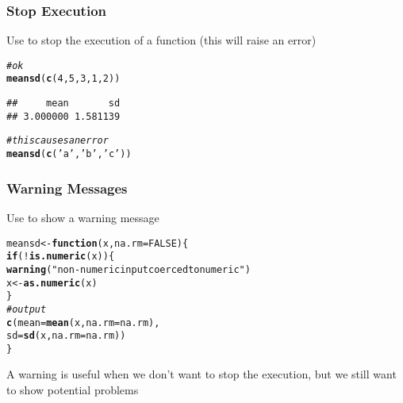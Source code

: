 \documentclass[12pt]{beamer}\usepackage[]{graphicx}\usepackage[]{color}
\makeatletter
\newcommand{\hlnum}[1]{\textcolor[rgb]{0.686,0.059,0.569}{#1}}%
\newcommand{\hlstr}[1]{\textcolor[rgb]{0.192,0.494,0.8}{#1}}%
\newcommand{\hlcom}[1]{\textcolor[rgb]{0.678,0.584,0.686}{\textit{#1}}}%
\newcommand{\hlopt}[1]{\textcolor[rgb]{0,0,0}{#1}}%
\newcommand{\hlstd}[1]{\textcolor[rgb]{0.345,0.345,0.345}{#1}}%
\newcommand{\hlkwa}[1]{\textcolor[rgb]{0.161,0.373,0.58}{\textbf{#1}}}%
\newcommand{\hlkwb}[1]{\textcolor[rgb]{0.69,0.353,0.396}{#1}}%
\newcommand{\hlkwc}[1]{\textcolor[rgb]{0.333,0.667,0.333}{#1}}%
\newcommand{\hlkwd}[1]{\textcolor[rgb]{0.737,0.353,0.396}{\textbf{#1}}}%
\newenvironment{kframe}{%
 \def\at@end@of@kframe{}%
 \ifinner\ifhmode%
  \def\at@end@of@kframe{\end{minipage}}%
  \begin{minipage}{\columnwidth}%
 \fi\fi%
 \def\FrameCommand##1{\hskip\@totalleftmargin \hskip-\fboxsep
 \colorbox{shadecolor}{##1}\hskip-\fboxsep
     \hskip-\linewidth \hskip-\@totalleftmargin \hskip\columnwidth}%
 \MakeFramed {\advance\hsize-\width
   \@totalleftmargin\z@ \linewidth\hsize
   \@setminipage}}%
 {\par\unskip\endMakeFramed%
 \at@end@of@kframe}
\newenvironment{knitrout}{}{} %
\makeatother
\begin{document}
\begin{frame}[fragile]
\frametitle{Stop Execution}

Use {\hilit {}} to stop the execution of a function (this will raise an error)
\begin{knitrout}\footnotesize
{}\color{fgcolor}\begin{kframe}
\begin{alltt}
\hlcom{# ok}
\hlkwd{meansd}\hlstd{(}\hlkwd{c}\hlstd{(}\hlnum{4}\hlstd{,} \hlnum{5}\hlstd{,} \hlnum{3}\hlstd{,} \hlnum{1}\hlstd{,} \hlnum{2}\hlstd{))}
\end{alltt}
\begin{verbatim}
##     mean       sd 
## 3.000000 1.581139
\end{verbatim}
\begin{alltt}
\hlcom{# this causes an error}
\hlkwd{meansd}\hlstd{(}\hlkwd{c}\hlstd{(}\hlstr{'a'}\hlstd{,} \hlstr{'b'}\hlstd{,} \hlstr{'c'}\hlstd{))}
\end{alltt}


{\ttfamily\noindent\bfseries{}}\end{kframe}
\end{knitrout}

\end{frame}


\begin{frame}[fragile]
\frametitle{Warning Messages}

Use {\hilit {}} to show a warning message
\begin{knitrout}\footnotesize
{}\color{fgcolor}\begin{kframe}
\begin{alltt}
\hlstd{meansd} \hlkwb{<-} \hlkwa{function}\hlstd{(}\hlkwc{x}\hlstd{,} \hlkwc{na.rm} \hlstd{=} \hlnum{FALSE}\hlstd{) \{}
  \hlkwa{if} \hlstd{(}\hlopt{!}\hlkwd{is.numeric}\hlstd{(x)) \{}
    \hlkwd{warning}\hlstd{(}\hlstr{"non-numeric input coerced to numeric"}\hlstd{)}
    \hlstd{x} \hlkwb{<-} \hlkwd{as.numeric}\hlstd{(x)}
  \hlstd{\}}
  \hlcom{# output}
  \hlkwd{c}\hlstd{(}\hlkwc{mean} \hlstd{=} \hlkwd{mean}\hlstd{(x,} \hlkwc{na.rm} \hlstd{= na.rm),}
    \hlkwc{sd} \hlstd{=} \hlkwd{sd}\hlstd{(x,} \hlkwc{na.rm} \hlstd{= na.rm))}
\hlstd{\}}
\end{alltt}
\end{kframe}
\end{knitrout}
A warning is useful when we don't want to stop the execution, but we still want to show potential problems

\end{frame}
\end{document}
